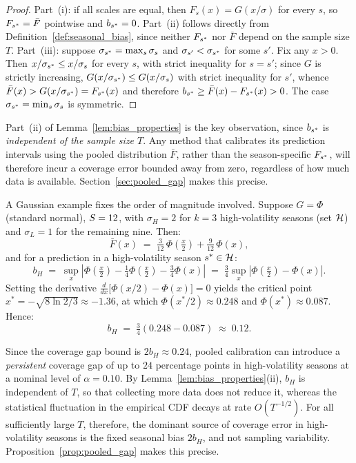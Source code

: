 \begin{proof}
  Part~(i): if all scales are equal, then $F_s(x) = G(x/\sigma)$ for
  every $s$, so $F_{s^*} = \bar{F}$ pointwise and $b_{s^*} = 0$.
  Part~(ii) follows directly from Definition~\ref{def:seasonal_bias},
  since neither $F_{s^*}$ nor $\bar{F}$ depend on the sample size $T$.
  Part~(iii): suppose $\sigma_{s^*} = \max_s \sigma_s$ and
  $\sigma_{s'} < \sigma_{s^*}$ for some $s'$.  Fix any $x > 0$.
  Then $x/\sigma_{s^*} \leq x/\sigma_s$ for every $s$, with strict
  inequality for $s = s'$; since $G$ is strictly increasing,
  $G(x/\sigma_{s^*}) \leq G(x/\sigma_s)$ with strict inequality for
  $s'$, whence
  $\bar{F}(x) > G(x/\sigma_{s^*}) = F_{s^*}(x)$ and therefore
  $b_{s^*} \geq \bar{F}(x) - F_{s^*}(x) > 0$.  The case
  $\sigma_{s^*} = \min_s \sigma_s$ is symmetric.
\end{proof}

Part~(ii) of Lemma~\ref{lem:bias_properties} is the key observation,
since $b_{s^*}$ is \emph{independent of the sample size $T$}.  Any
method that calibrates its prediction intervals using the pooled
distribution $\bar{F}$, rather than the season-specific $F_{s^*}$,
will therefore incur a coverage error bounded away from zero,
regardless of how much data is available.  Section~\ref{sec:pooled_gap}
makes this precise.

A Gaussian example fixes the order of magnitude involved.
Suppose $G = \Phi$ (standard normal), $S = 12$, with
$\sigma_H = 2$ for $k = 3$ high-volatility seasons (set $\mathcal{H}$)
and $\sigma_L = 1$ for the remaining nine.  Then:
\[
  \bar{F}(x)
  \;=\;
  \tfrac{3}{12}\,\Phi\!\left(\tfrac{x}{2}\right)
  +
  \tfrac{9}{12}\,\Phi(x),
\]
and for a prediction in a high-volatility season $s^* \in \mathcal{H}$:
\[
  b_H
  \;=\;
  \sup_x\!
  \left|
    \Phi\!\left(\tfrac{x}{2}\right)
    -\tfrac{1}{4}\Phi\!\left(\tfrac{x}{2}\right)
    -\tfrac{3}{4}\Phi(x)
  \right|
  \;=\;
  \tfrac{3}{4}\sup_x\!\left|\Phi\!\left(\tfrac{x}{2}\right) - \Phi(x)\right|.
\]
Setting the derivative $\frac{d}{dx}\bigl[\Phi(x/2)-\Phi(x)\bigr] = 0$
yields the critical point $x^* = -\sqrt{8\ln 2/3} \approx -1.36$,
at which $\Phi(x^*/2) \approx 0.248$ and $\Phi(x^*) \approx 0.087$.
Hence:
\[
  b_H \;=\; \tfrac{3}{4}(0.248 - 0.087) \;\approx\; 0.12.
\]

Since the coverage gap bound is $2b_H \approx 0.24$, pooled
calibration can introduce a \emph{persistent} coverage gap of up to
$24$ percentage points in high-volatility seasons at a nominal level
of $\alpha = 0.10$.  By Lemma~\ref{lem:bias_properties}(ii), $b_H$
is independent of $T$, so that collecting more data does not reduce
it, whereas the statistical fluctuation in the empirical CDF decays
at rate $O(T^{-1/2})$.  For all sufficiently large $T$, therefore,
the dominant source of coverage error in high-volatility seasons is
the fixed seasonal bias $2b_H$, and not sampling variability.
Proposition~\ref{prop:pooled_gap} makes this precise.\medskip

